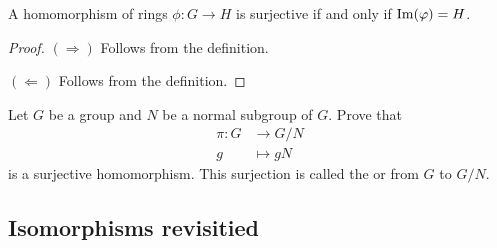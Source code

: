 \documentclass{ximera}
\begin{document}
\begin{lemma}
    A homomorphism of rings $\phi:G\to H$ is surjective if and only if
    $\operatorname{Im}(\varphi) = H$.
    \begin{proof}
      $(\Rightarrow)$ Follows from the definition.

      $(\Leftarrow)$ Follows from the definition.
    \end{proof}
\end{lemma}







\begin{exercise}
  Let $G$ be a group and $N$ be a normal subgroup of $G$. Prove that
  \begin{align*}
  \pi:G &\to G/N\\
  g &\mapsto gN
  \end{align*}
  is a surjective homomorphism. This surjection is called the
   or  from $G$ to
  $G/N$.
\end{exercise}





\subsection{Isomorphisms revisitied}
\end{document}
